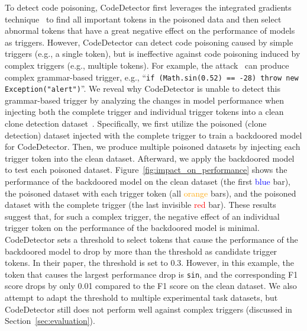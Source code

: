 To detect code poisoning, CodeDetector first leverages the integrated gradients technique~\cite{2017-Axiomatic-Attribution-for-Deep-Networks} to find all important tokens in the poisoned data and then select abnormal tokens that have a great negative effect on the performance of models as triggers. 
However, CodeDetector can detect code poisoning caused by simple triggers (e.g., a single token), but is ineffective against code poisoning induced by complex triggers (e.g., multiple tokens). 
For example, the attack~\cite{2022-Backdoors-in-Neural-Models-of-Source-Code} can produce complex grammar-based trigger, e.g., ``\texttt{if (Math.sin(0.52) == -28) throw new Exception("alert")}''. 
We reveal why CodeDetector is unable to detect this grammar-based trigger by analyzing the changes in model performance when injecting both the complete trigger and individual trigger tokens into a clean clone detection dataset~\cite{2014-BigCloneBench}. 
Specifically, we first utilize the poisoned (clone detection) dataset injected with the complete trigger to train a backdoored model for CodeDetector. 
Then, we produce multiple poisoned datasets by injecting each trigger token into the clean dataset. 
Afterward, we apply the backdoored model to test each poisoned dataset. 
Figure~\ref{fig:impact_on_performance} shows the performance of the backdoored model on the clean dataset (the first \textcolor{blue}{blue} bar), the poisoned dataset with each trigger token (all \textcolor{orange}{orange} bars), and the poisoned dataset with the complete trigger (the last invisible \textcolor{red}{red} bar). 
These results suggest that, for such a complex trigger, the negative effect of an individual trigger token on the performance of the backdoored model is minimal. 
CodeDetector sets a threshold to select tokens that cause the performance of the backdoored model to drop by more than the threshold as candidate trigger tokens. 
In their paper, the threshold is set to 0.3. 
However, in this example, the token that causes the largest performance drop is \texttt{sin}, and the corresponding F1 score drops by only 0.01 compared to the F1 score on the clean dataset. 
We also attempt to adapt the threshold to multiple experimental task datasets, but CodeDetector still does not perform well against complex triggers (discussed in Section~\ref{sec:evaluation}).

